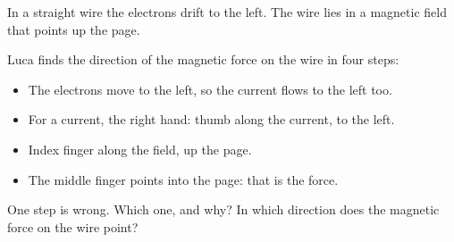 In a straight wire the electrons drift to the left. The wire lies in a magnetic field that points up the page.

\begin{center}
\end{center}

Luca finds the direction of the magnetic force on the wire in four steps:
\begin{itemize}
\item[1.] The electrons move to the left, so the current flows to the left too.
\item[2.] For a current, the right hand: thumb along the current, to the left.
\item[3.] Index finger along the field, up the page.
\item[4.] The middle finger points into the page: that is the force.
\end{itemize}

\begin{abcliste}
\abc One step is wrong. Which one, and why?
\abc In which direction does the magnetic force on the wire point?
\end{abcliste}
